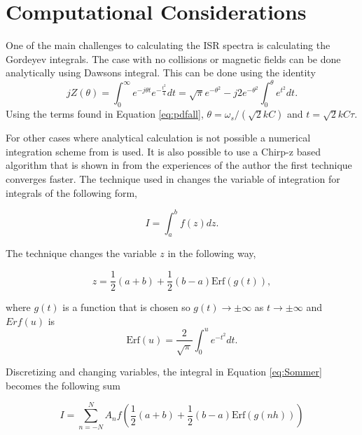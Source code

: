  \section{Computational Considerations}
One of the main challenges to calculating the ISR spectra is calculating the Gordeyev integrals. The case with no collisions or magnetic fields can be done analytically using Dawsons integral. This can be done using the identity
\begin{equation}
\label{eq:daw1}
jZ(\theta) = \int_0^{\infty} e^{-j\theta t}e^{-\frac{t^2}{4}}dt = \sqrt{\pi}e^{-\theta^2}-j2e^{-\theta^2}\int_0^\theta e^{t^2}dt.
\end{equation}
Using the terms found in Equation \ref{eq:pdfall}, $\theta=\omega_s/\left(\sqrt{2}kC\right)$ and $t=\sqrt{2}kC\tau$.

For other cases where analytical calculation is not possible a numerical integration scheme from \citet{Ooi:2007jx} is used. It is also possible to use a Chirp-z based algorithm that is shown in \citet{Li:1991gr} from the experiences of the author the first technique converges faster. The technique used in \citet{Ooi:2007jx} changes the variable of integration for integrals of the following form,

\begin{equation}
\label{eq:Sommer}
I=\int_a^b f(z) dz.
\end{equation}

\noindent The technique changes the variable $z$ in the following way,

\begin{equation}
\label{eq:newz}
z = \frac{1}{2}(a+b)+\frac{1}{2} (b-a)\text{Erf}(g(t)),
\end{equation}

\noindent where $g(t)$ is a function that is chosen so  $g(t)\rightarrow\pm \infty$ as $t\rightarrow\pm \infty$ and $Erf(u)$ is 
\begin{equation}
\label{eq:erf1}
\text{Erf}(u) = \frac{2}{\sqrt{\pi}}\int_0^u e^{-t^2}dt.
\end{equation}

\noindent Discretizing and changing variables, the integral in Equation \ref{eq:Sommer} becomes the following sum

\begin{equation}
\label{eq:erfsum1}
I=\displaystyle \sum_{n=-N}^N A_nf\left( \frac{1}{2}(a+b)+\frac{1}{2} (b-a)\text{Erf}(g(nh))\right)
\end{equation}

